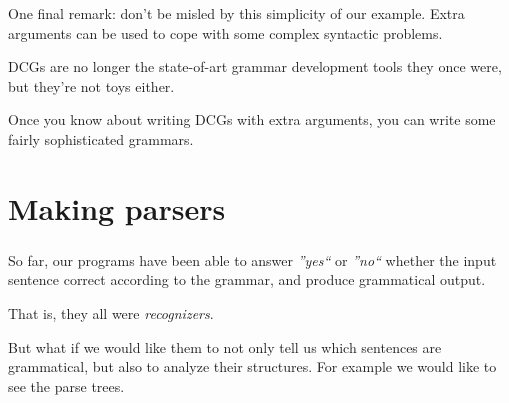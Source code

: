 

\begin{frame}
	\frametitle{\insertsection}
	
	One final remark: don’t be misled by this simplicity of our example. Extra arguments can be used to cope with some complex syntactic problems. 
	
	DCGs are no longer the state-of-art grammar development tools they once were, but they’re not toys either. 
	
	Once you know about writing DCGs with extra arguments, you can write some fairly sophisticated grammars.
\end{frame}


\section{Making parsers}

\begin{frame}
	\frametitle{\insertsection}
	
	So far, our programs have been able to answer \textit{''yes``} or \textit{''no``} whether the input sentence correct according to the grammar, and produce grammatical output.
	
	That is, they all were \textit{recognizers}.
	
	But what if we would like them to not only tell us which sentences are grammatical, but also to analyze their structures. For example we would like to see the parse trees.
	
\end{frame}


